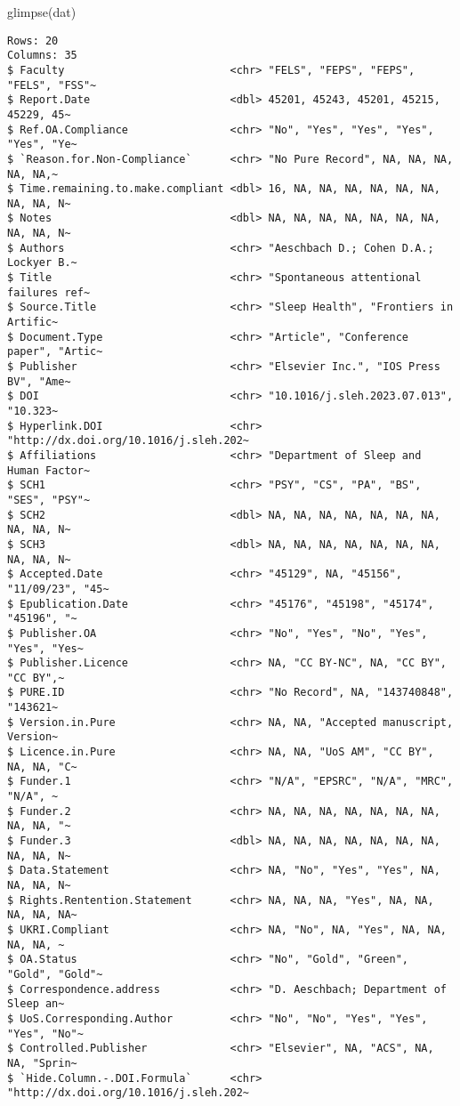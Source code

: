 \documentclass[
  letterpaper,
  DIV=11,
  numbers=noendperiod]{scrreprt}
\newenvironment{Shaded}{\begin{snugshade}}{\end{snugshade}}
\newcommand{\FunctionTok}[1]{\textcolor[rgb]{0.28,0.35,0.67}{#1}}
\newcommand{\NormalTok}[1]{\textcolor[rgb]{0.00,0.23,0.31}{#1}}
\begin{document}
\begin{Shaded}
\begin{Highlighting}[]
\FunctionTok{glimpse}\NormalTok{(dat)}
\end{Highlighting}
\end{Shaded}

\begin{verbatim}
Rows: 20
Columns: 35
$ Faculty                          <chr> "FELS", "FEPS", "FEPS", "FELS", "FSS"~
$ Report.Date                      <dbl> 45201, 45243, 45201, 45215, 45229, 45~
$ Ref.OA.Compliance                <chr> "No", "Yes", "Yes", "Yes", "Yes", "Ye~
$ `Reason.for.Non-Compliance`      <chr> "No Pure Record", NA, NA, NA, NA, NA,~
$ Time.remaining.to.make.compliant <dbl> 16, NA, NA, NA, NA, NA, NA, NA, NA, N~
$ Notes                            <dbl> NA, NA, NA, NA, NA, NA, NA, NA, NA, N~
$ Authors                          <chr> "Aeschbach D.; Cohen D.A.; Lockyer B.~
$ Title                            <chr> "Spontaneous attentional failures ref~
$ Source.Title                     <chr> "Sleep Health", "Frontiers in Artific~
$ Document.Type                    <chr> "Article", "Conference paper", "Artic~
$ Publisher                        <chr> "Elsevier Inc.", "IOS Press BV", "Ame~
$ DOI                              <chr> "10.1016/j.sleh.2023.07.013", "10.323~
$ Hyperlink.DOI                    <chr> "http://dx.doi.org/10.1016/j.sleh.202~
$ Affiliations                     <chr> "Department of Sleep and Human Factor~
$ SCH1                             <chr> "PSY", "CS", "PA", "BS", "SES", "PSY"~
$ SCH2                             <dbl> NA, NA, NA, NA, NA, NA, NA, NA, NA, N~
$ SCH3                             <dbl> NA, NA, NA, NA, NA, NA, NA, NA, NA, N~
$ Accepted.Date                    <chr> "45129", NA, "45156", "11/09/23", "45~
$ Epublication.Date                <chr> "45176", "45198", "45174", "45196", "~
$ Publisher.OA                     <chr> "No", "Yes", "No", "Yes", "Yes", "Yes~
$ Publisher.Licence                <chr> NA, "CC BY-NC", NA, "CC BY", "CC BY",~
$ PURE.ID                          <chr> "No Record", NA, "143740848", "143621~
$ Version.in.Pure                  <chr> NA, NA, "Accepted manuscript, Version~
$ Licence.in.Pure                  <chr> NA, NA, "UoS AM", "CC BY", NA, NA, "C~
$ Funder.1                         <chr> "N/A", "EPSRC", "N/A", "MRC", "N/A", ~
$ Funder.2                         <chr> NA, NA, NA, NA, NA, NA, NA, NA, NA, "~
$ Funder.3                         <dbl> NA, NA, NA, NA, NA, NA, NA, NA, NA, N~
$ Data.Statement                   <chr> NA, "No", "Yes", "Yes", NA, NA, NA, N~
$ Rights.Rentention.Statement      <chr> NA, NA, NA, "Yes", NA, NA, NA, NA, NA~
$ UKRI.Compliant                   <chr> NA, "No", NA, "Yes", NA, NA, NA, NA, ~
$ OA.Status                        <chr> "No", "Gold", "Green", "Gold", "Gold"~
$ Correspondence.address           <chr> "D. Aeschbach; Department of Sleep an~
$ UoS.Corresponding.Author         <chr> "No", "No", "Yes", "Yes", "Yes", "No"~
$ Controlled.Publisher             <chr> "Elsevier", NA, "ACS", NA, NA, "Sprin~
$ `Hide.Column.-.DOI.Formula`      <chr> "http://dx.doi.org/10.1016/j.sleh.202~
\end{verbatim}
\end{document}
